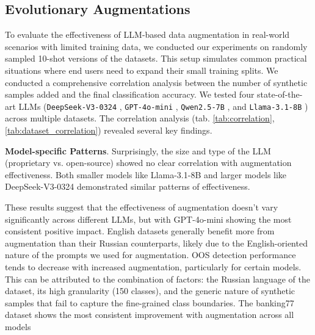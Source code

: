 \subsection{Evolutionary Augmentations}\label{sec:augmentations}

To evaluate the effectiveness of LLM-based data augmentation in real-world scenarios with limited training data, we conducted our experiments on randomly sampled 10-shot versions of the datasets. This setup simulates common practical situations where end users need to expand their small training splits. We conducted a comprehensive correlation analysis between the number of synthetic samples added and the final classification accuracy. We tested four state-of-the-art LLMs (\texttt{DeepSeek-V3-0324} \cite{deepseekai2025deepseekv3technicalreport}, \texttt{GPT-4o-mini} \cite{gpt4o_blog}, \texttt{Qwen2.5-7B} \cite{qwen2025qwen25technicalreport}, and \texttt{Llama-3.1-8B} \cite{llama31_blog}) across multiple datasets. The correlation analysis (tab. \ref{tab:correlation}, \ref{tab:dataset_correlation}) revealed several key findings.

\textbf{Model-specific Patterns}. Surprisingly, the size and type of the LLM (proprietary vs. open-source) showed no clear correlation with augmentation effectiveness. Both smaller models like Llama-3.1-8B and larger models like DeepSeek-V3-0324 demonstrated similar patterns of effectiveness.

These results suggest that the effectiveness of augmentation doesn't vary significantly across different LLMs, but with GPT-4o-mini showing the most consistent positive impact. English datasets generally benefit more from augmentation than their Russian counterparts, likely due to the English-oriented nature of the prompts we used for augmentation. OOS detection performance tends to decrease with increased augmentation, particularly for certain models. This can be attributed to the combination of factors: the Russian language of the dataset, its high granularity (150 classes), and the generic nature of synthetic samples that fail to capture the fine-grained class boundaries. The banking77 dataset shows the most consistent improvement with augmentation across all models

